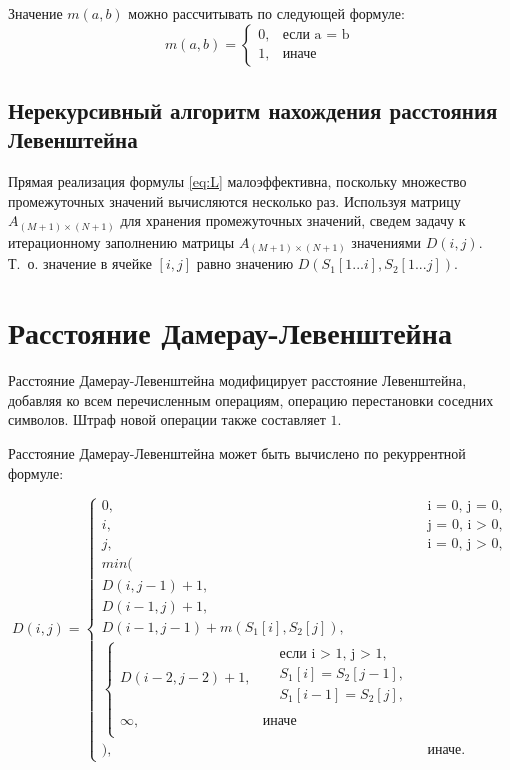 Значение $ m(a, b) $ можно рассчитывать по следующей формуле:
\begin{equation}
	m(a, b) = \begin{cases}
		0, &\text{если a = b}\\
		1, &\text{иначе}
	\end{cases}
\end{equation}

\subsection{Нерекурсивный алгоритм нахождения расстояния Левенштейна}

Прямая реализация формулы \ref{eq:L} малоэффективна, поскольку множество промежуточных значений вычисляются несколько раз. Используя матрицу $ A_{(M+1) \times (N+1)} $ для хранения промежуточных значений, сведем задачу к итерационному заполнению матрицы $ A_{(M+1) \times (N+1)} $ значениями $ D(i, j) $. Т.~о. значение в ячейке $ [i, j] $ равно значению $ D(S_1[1...i], S_2[1...j]) $.

\section{Расстояние Дамерау-Левенштейна}

Расстояние Дамерау-Левенштейна модифицирует расстояние Левенштейна, добавляя ко всем перечисленным операциям, операцию перестановки соседних символов. Штраф новой операции также составляет $ 1 $. 

Расстояние Дамерау-Левенштейна может быть вычислено по рекуррентной формуле:

\begin{equation}
	\label{eq:DL}
	D(i, j) = 
	\begin{cases}
		0, &\text{i = 0, j = 0,}\\
		i, &\text{j = 0, i > 0,}\\
		j, &\text{i = 0, j > 0,}\\
		min(\\
			D(i, j - 1) + 1,\\
			D(i - 1, j) + 1,\\ 
			D(i - 1, j - 1) + m(S_{1}[i], S_{2}[j]), \\
			\begin{cases}
				D(i - 2, j - 2) + 1, & \begin{aligned}
					& \text{если i > 1, j > 1}, \\
					& S_{1}[i] = S_{2}[j - 1], \\
					& S_{1}[i - 1] = S_{2}[j], \\
				\end{aligned}\\
				\infty, & \textrm{иначе} \\
			\end{cases} \\
		), & \textrm{иначе.}
	\end{cases}
\end{equation}

